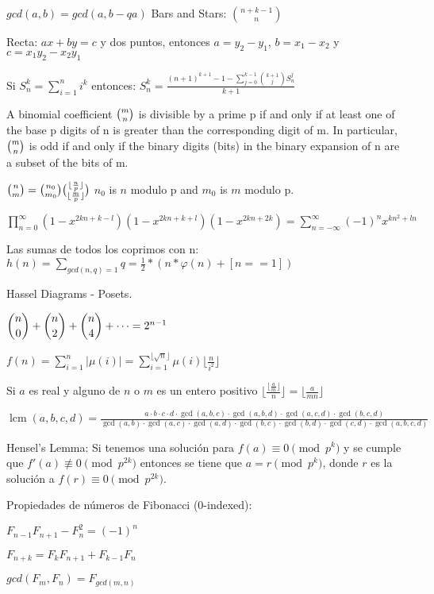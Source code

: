 {\normalsize
    $ gcd(a,b) = gcd(a, b-qa)$
    \hspace{4em} Bars and Stars: $ \binom{n+k-1}{n} $
    
    Recta: $ax + by = c$ y dos puntos, entonces $a = y_2-y_1$, $b = x_1-x_2$ y $c = x_1y_2-x_2y_1$
    
    Si $S_{n}^{k} = \sum_{i=1}^{n} i^k$ entonces: $S_{n}^{k} = \frac{ (n+1)^{k+1} - 1 - \sum_{j=0}^{k-1} {{k+1} \choose j} S_n^j }{ k+1 }$

    A binomial coefficient ${\tbinom {m}{n}}$ is divisible by a prime p if and only if at least one of the base p digits of n is greater than the corresponding digit of m.
    In particular, ${\displaystyle {\tbinom {m}{n}}}$ is odd if and only if the binary digits (bits) in the binary expansion of n are a subset of the bits of m.

    ${\tbinom {n}{m}} = {\tbinom {n_0}{m_0}} {\tbinom {\lfloor \frac{n}{p} \rfloor }{\lfloor \frac{m}{p} \rfloor}}$ $n_0$ is $n$ modulo p and $m_0$ is $m$ modulo p.

    $\displaystyle\prod_{n=0}^{\infty} (1-x^{2kn+k-l})(1-x^{2kn+k+l})(1-x^{2kn+2k}) = \displaystyle\sum_{n=-\infty}^{\infty}(-1)^nx^{kn^2+ln}$

    Las sumas de todos los coprimos con n: $\displaystyle h(n) = \sum_{gcd(n,q)=1} q = \frac{1}{2} * (n  * \varphi(n) + [n==1])$

    Hassel Diagrams - Posets.

    $\dbinom n 0 + \dbinom n 2 + \dbinom n 4 + \dotsb = 2^{n - 1}$

    $\displaystyle f(n) = \sum_{i=1}^{n} |\mu(i)| = \sum_{i=1}^{  \lfloor \sqrt{n} \rfloor} \mu(i) \lfloor \frac{n}{i^2} \rfloor$

    Si $a$ es real y alguno de $n$ o $m$ es un entero positivo $\displaystyle \lfloor \frac{\lfloor \frac{a}{m} \rfloor }{n} \rfloor = \lfloor \frac{a}{mn} \rfloor$

    $ \operatorname{lcm}(a,b,c,d)=\frac{a\cdot b\cdot c\cdot d\cdot\operatorname{gcd}(a,b,c)\cdot\operatorname{gcd}(a,b,d)\cdot\operatorname{gcd}(a,c,d)\cdot\operatorname{gcd}(b,c,d)}{\operatorname{gcd}(a,b)\cdot\operatorname{gcd}(a,c)\cdot\operatorname{gcd}(a,d)\cdot\operatorname{gcd}(b,c)\cdot\operatorname{gcd}(b,d)\cdot\operatorname{gcd}(c,d)\cdot\operatorname{gcd}(a,b,c,d)} $

    Hensel's Lemma: Si tenemos una solución para $f(a) \equiv 0 \pmod{p^k}$ y se cumple que $f'(a) \not\equiv 0 \pmod{p^{2k}}$ entonces se tiene que $a = r \pmod{p^k}$, donde $r$ es la solución a $f(r) \equiv 0 \pmod{p^{2k}}$.

    Propiedades de números de Fibonacci (0-indexed): 

    \begin{center}
        $F_{n-1}F_{n+1} - F_n^2 = (-1)^n$

        $F_{n+k} = F_kF_{n+1} + F_{k-1}F_n$

        $gcd(F_m, F_n) = F_{gcd(m,n)}$
    \end{center}

}